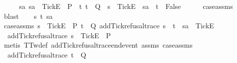 \begin{isabellebody}
{\ \ \isamarkupfalse%
\ \isamarkupfalse%
\ {\isachardoublequoteopen}{\isasymforall}sa{\isachardot}\ sa\ {\isacharat}\ {\isacharbrackleft}{\isacharbrackleft}Tick{\isacharbrackright}\isactrlsub E{\isacharbrackright}\ {\isasymin}\ P\ {\isasymlongrightarrow}\ {\isacharparenleft}{\isasymforall}t{\isachardot}\ t\ {\isasymin}\ Q\ {\isasymlongrightarrow}\ s\ {\isacharat}\ {\isacharbrackleft}{\isacharbrackleft}Tick{\isacharbrackright}\isactrlsub E{\isacharbrackright}\ {\isasymnoteq}\ sa\ {\isacharat}\ t{\isacharparenright}\ {\isasymLongrightarrow}\ False{\isachardoublequoteclose}\isanewline
\ \ \ \ \isamarkupfalse%
\ case{\isacharunderscore}assms{\isacharparenleft}{}{\isacharparenright}\ \isamarkupfalse%
\ blast\isanewline
{}\isamarkupfalse%
\isanewline
\ \ \isamarkupfalse%
\ s\ t\ sa\isanewline
\ \ \isamarkupfalse%
\ case{\isacharunderscore}assms{\isacharcolon}\ {\isachardoublequoteopen}s\ {\isacharat}\ {\isacharbrackleft}{\isacharbrackleft}Tick{\isacharbrackright}\isactrlsub E{\isacharbrackright}\ {\isasymin}\ P{\isachardoublequoteclose}\ {\isachardoublequoteopen}t\ {\isasymin}\ Q{\isachardoublequoteclose}\ {\isachardoublequoteopen}add{\isacharunderscore}Tick{\isacharunderscore}refusal{\isacharunderscore}trace\ {\isacharparenleft}s\ {\isacharat}\ t{\isacharparenright}\ {\isacharequal}\ sa\ {\isacharat}\ {\isacharbrackleft}{\isacharbrackleft}Tick{\isacharbrackright}\isactrlsub E{\isacharbrackright}{\isachardoublequoteclose}\isanewline
\ \ \isamarkupfalse%
\ {}{\isacharcolon}\ {\isachardoublequoteopen}add{\isacharunderscore}Tick{\isacharunderscore}refusal{\isacharunderscore}trace\ s\ {\isacharat}\ {\isacharbrackleft}{\isacharbrackleft}Tick{\isacharbrackright}\isactrlsub E{\isacharbrackright}\ {\isasymin}\ P{\isachardoublequoteclose}\isanewline
\ \ \ \ \isamarkupfalse%
\ {\isacharparenleft}metis\ TT{}w{\isacharunderscore}def\ add{\isacharunderscore}Tick{\isacharunderscore}refusal{\isacharunderscore}trace{\isacharunderscore}end{\isacharunderscore}event\ assms{\isacharparenleft}{}{\isacharparenright}\ case{\isacharunderscore}assms{\isacharparenleft}{}{\isacharparenright}{\isacharparenright}\isanewline
\ \ \isamarkupfalse%
\ {}{\isacharcolon}\ {\isachardoublequoteopen}add{\isacharunderscore}Tick{\isacharunderscore}refusal{\isacharunderscore}trace\ t\ {\isasymin}\ Q{\isachardoublequoteclose}\isanewline
\ \ \ \ \isamarkupfalse%
}
\end{isabellebody}
